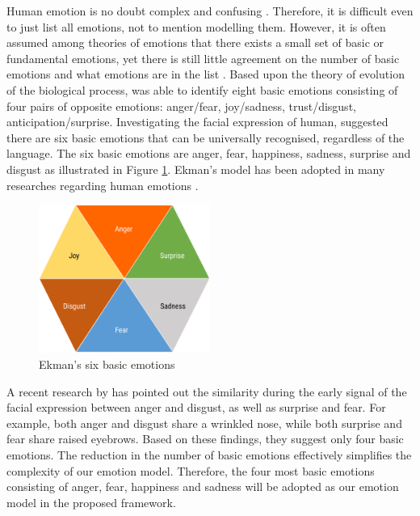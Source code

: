 Human emotion is no doubt complex and confusing \citet{plutchik2001nature}. Therefore, it is difficult even to just list all emotions, not to mention modelling them. However, it is often assumed among theories of emotions that there exists a small set of basic or fundamental emotions, yet there is still little agreement on the number of basic emotions and what emotions are in the list \citep{Ortony1990}. Based upon the theory of evolution of the biological process, \citet{plutchik2001integration} was able to identify eight basic emotions consisting of four pairs of opposite emotions: anger/fear, joy/sadness, trust/disgust, anticipation/surprise. Investigating the facial expression of human, \citet{ekman1971constants} suggested there are six basic emotions that can be universally recognised, regardless of the language. The six basic emotions are anger, fear, happiness, sadness, surprise and disgust as illustrated in Figure \ref{fig:emotionModel}. Ekman's model has been adopted in many researches regarding human emotions \citep{mohammad2014using, roberts2012empatweet, alm2005emotions}. 

\begin{figure}[htb!]
\centering    
\includegraphics[width=0.5\textwidth]{EkmanModel}
\caption{Ekman's six basic emotions}
\label{fig:emotionModel}
\end{figure}

A recent research by \cite{Jack2014} has pointed out the similarity during the early signal of the facial expression between anger and disgust, as well as surprise and fear. For example, both anger and disgust share a wrinkled nose, while both surprise and fear share raised eyebrows. Based on these findings, they suggest only four basic emotions. The reduction in the number of basic emotions effectively simplifies the complexity of our emotion model. Therefore, the four most basic emotions consisting of anger, fear, happiness and sadness will be adopted as our emotion model in the proposed framework.


